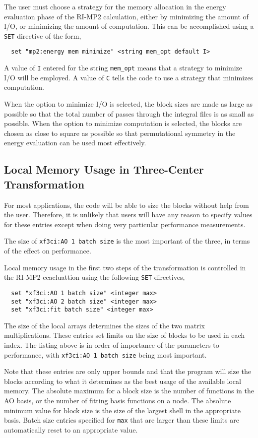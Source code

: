 The user must choose a  strategy for the memory allocation in the energy
evaluation phase of the RI-MP2 calculation, either by minimizing the amount
of I/O, or minimizing the amount of computation.  This can be accomplished 
using a \verb+SET+ directive of the form,

\begin{verbatim}
  set "mp2:energy mem minimize" <string mem_opt default I>
\end{verbatim}

A value of \verb+I+ entered for the string \verb+mem_opt+ means that a
strategy to minimize I/O will be employed.  A value of \verb+C+ tells
the code to use a strategy that minimizes computation.

When the option to minimize I/O is selected, the block sizes are made
as large as possible so that the total number of passes through the
integral files is as small as possible.  When the option to minimize
computation is selected, the blocks are chosen as close to square as
possible so that permutational symmetry in the energy evaluation can
be used most effectively.


\subsection{Local Memory Usage in Three-Center Transformation}

For most applications, the code will be able to size the blocks
without help from the user.  Therefore, it is unlikely that users will
have any reason to specify values for these entries except when doing
very particular performance measurements.

The size of \verb+xf3ci:AO 1 batch size+ is the most important of the
three, in terms of the effect on performance.

Local memory usage in the first two steps of the transformation is
controlled in the RI-MP2 ccacluattion using the following \verb+SET+
directives,

\begin{verbatim}
  set "xf3ci:AO 1 batch size" <integer max>
  set "xf3ci:AO 2 batch size" <integer max>
  set "xf3ci:fit batch size" <integer max>
\end{verbatim}

The size of the local arrays determines the sizes of the two matrix
multiplications.  These entries set limits on the size of blocks to be
used in each index.  The listing above is in order of importance of
the parameters to performance, with \verb+xf3ci:AO 1 batch size+ being
most important.

Note that these entries are only upper bounds and that the program
will size the blocks according to what it determines as the best usage of
the available local memory.  The absolute maximum for a block size is
the number of functions in the AO basis, or the number of fitting basis
functions on a node.  The absolute minimum value for block size is the 
size of the largest shell in the appropriate basis.  Batch size entries 
specified for \verb+max+  that are larger than these limits are 
automatically reset to an appropriate value.


